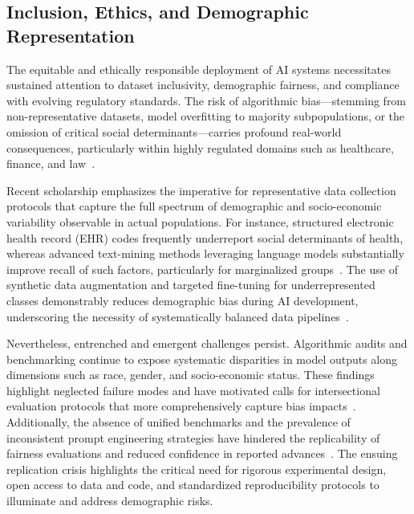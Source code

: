 \documentclass[sigconf]{acmart}
\begin{document}
\subsection{Inclusion, Ethics, and Demographic Representation}

The equitable and ethically responsible deployment of AI systems necessitates sustained attention to dataset inclusivity, demographic fairness, and compliance with evolving regulatory standards. The risk of algorithmic bias—stemming from non-representative datasets, model overfitting to majority subpopulations, or the omission of critical social determinants—carries profound real-world consequences, particularly within highly regulated domains such as healthcare, finance, and law~\cite{ref1,ref2,ref10,ref21,ref22,ref23,ref42,ref43,ref44,ref49,ref52,ref53,ref65}.

Recent scholarship emphasizes the imperative for representative data collection protocols that capture the full spectrum of demographic and socio-economic variability observable in actual populations. For instance, structured electronic health record (EHR) codes frequently underreport social determinants of health, whereas advanced text-mining methods leveraging language models substantially improve recall of such factors, particularly for marginalized groups~\cite{ref2,ref44,ref53}. The use of synthetic data augmentation and targeted fine-tuning for underrepresented classes demonstrably reduces demographic bias during AI development, underscoring the necessity of systematically balanced data pipelines~\cite{ref2,ref21,ref22,ref65}.

Nevertheless, entrenched and emergent challenges persist. Algorithmic audits and benchmarking continue to expose systematic disparities in model outputs along dimensions such as race, gender, and socio-economic status. These findings highlight neglected failure modes and have motivated calls for intersectional evaluation protocols that more comprehensively capture bias impacts~\cite{ref1,ref10,ref43,ref52,ref53}. Additionally, the absence of unified benchmarks and the prevalence of inconsistent prompt engineering strategies have hindered the replicability of fairness evaluations and reduced confidence in reported advances~\cite{ref21,ref22,ref23,ref42}. The ensuing replication crisis highlights the critical need for rigorous experimental design, open access to data and code, and standardized reproducibility protocols to illuminate and address demographic risks.
\end{document}
